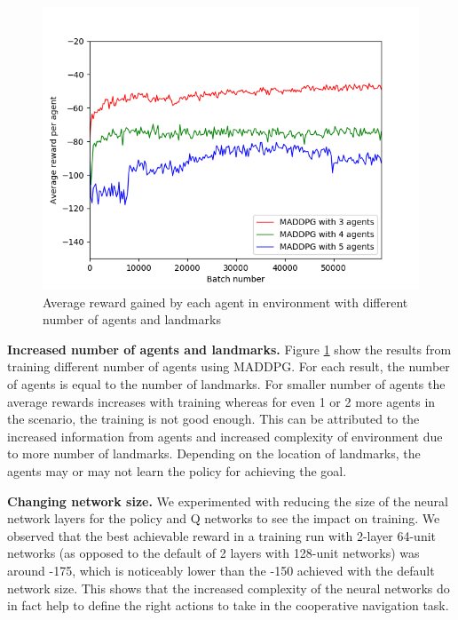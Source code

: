 \documentclass{article}
\begin{document}
\begin{figure}
\begin{center}
\includegraphics[scale=0.5]{maddpg_3,4,5agents.png}
\end{center}
\caption{Average reward gained by each agent in environment with different number of agents and landmarks}
\label{fig:avg_reward_multiple_agents}
\end{figure}

\textbf{Increased number of agents and landmarks.} Figure \ref{fig:avg_reward_multiple_agents} show the results from training different number of agents using MADDPG. For each result, the number of agents is equal to the number of landmarks. For smaller number of agents the average rewards increases with training whereas for even 1 or 2 more agents in the scenario, the training is not good enough. This can be attributed to the increased information from agents and increased complexity of environment due to more number of landmarks. Depending on the location of landmarks, the agents may or may not learn the policy for achieving the goal.   

\textbf{Changing network size.} We experimented with reducing the size of the neural network layers for the policy and Q networks to see the impact on training. We observed that the best achievable reward in a training run with 2-layer 64-unit networks (as opposed to the default of 2 layers with 128-unit networks) was around -175, which is noticeably lower than the -150 achieved with the default network size. This shows that the increased complexity of the neural networks do in fact help to define the right actions to take in the cooperative navigation task. 
\end{document}
